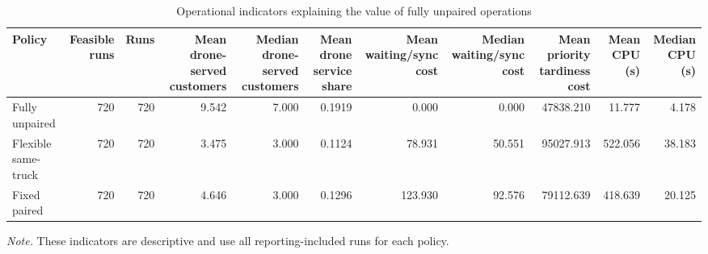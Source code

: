 \begin{table}[!htbp]
\centering
\caption{Operational indicators explaining the value of fully unpaired operations}
\label{tab:full_unpairing_mechanism}
\begin{tabular}{lrrrrrrrrrr}
\toprule
Policy & Feasible runs & Runs & Mean drone-served customers & Median drone-served customers & Mean drone service share & Mean waiting/sync cost & Median waiting/sync cost & Mean priority tardiness cost & Mean CPU (s) & Median CPU (s) \\
\midrule
Fully unpaired & 720 & 720 & 9.542 & 7.000 & 0.1919 & 0.000 & 0.000 & 47838.210 & 11.777 & 4.178 \\
Flexible same-truck & 720 & 720 & 3.475 & 3.000 & 0.1124 & 78.931 & 50.551 & 95027.913 & 522.056 & 38.183 \\
Fixed paired & 720 & 720 & 4.646 & 3.000 & 0.1296 & 123.930 & 92.576 & 79112.639 & 418.639 & 20.125 \\
\bottomrule
\end{tabular}
\vspace{2pt}
\parbox{\linewidth}{\footnotesize \emph{Note.} These indicators are descriptive and use all reporting-included runs for each policy.}
\end{table}
